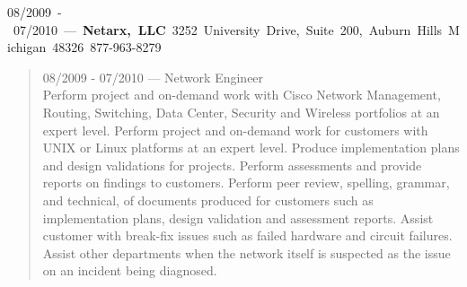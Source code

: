 \mbox{08/2009 - 07/2010 --- {\bf Netarx, LLC} 3252 University Drive, Suite 200, Auburn Hills Michigan 48326 877-963-8279}
\begin{quote}
08/2009 - 07/2010 --- Network Engineer\\
Perform project and on-demand work with Cisco Network Management, Routing, Switching, Data Center, Security and Wireless portfolios at an expert level.  Perform project and on-demand work for customers with UNIX or Linux platforms at an expert level. Produce implementation plans and design validations for projects. Perform assessments and provide reports on findings to customers. Perform peer review, spelling, grammar, and technical, of documents produced for customers such as implementation plans, design validation and assessment reports. Assist customer with break-fix issues such as failed hardware and circuit failures. Assist other departments when the network itself is suspected as the issue on an incident being diagnosed.
\end{quote}
